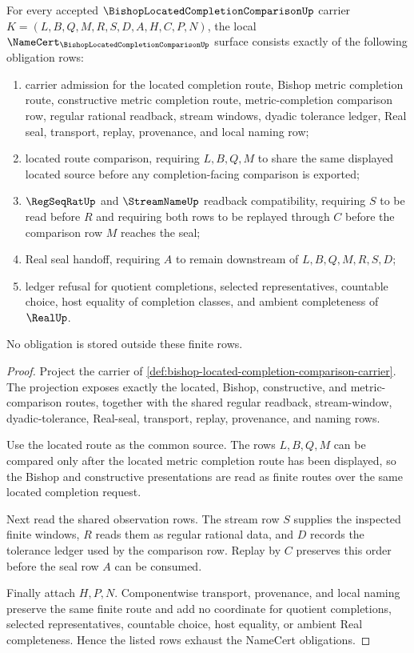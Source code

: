 \begin{theorem}
\label{thm:bishop-located-completion-comparison-namecert-obligations}
For every accepted $\BishopLocatedCompletionComparisonUp$ carrier $K=(L,B,Q,M,R,S,D,A,H,C,P,N)$, the local $\NameCert_{\BishopLocatedCompletionComparisonUp}$ surface consists exactly of the following obligation rows:
\begin{enumerate}
\item carrier admission for the located completion route, Bishop metric completion route, constructive metric completion route, metric-completion comparison row, regular rational readback, stream windows, dyadic tolerance ledger, Real seal, transport, replay, provenance, and local naming row;
\item located route comparison, requiring $L,B,Q,M$ to share the same displayed located source before any completion-facing comparison is exported;
\item $\RegSeqRatUp$ and $\StreamNameUp$ readback compatibility, requiring $S$ to be read before $R$ and requiring both rows to be replayed through $C$ before the comparison row $M$ reaches the seal;
\item Real seal handoff, requiring $A$ to remain downstream of $L,B,Q,M,R,S,D$;
\item ledger refusal for quotient completions, selected representatives, countable choice, host equality of completion classes, and ambient completeness of $\RealUp$.
\end{enumerate}
No obligation is stored outside these finite rows.
\end{theorem}
\begin{proof}
Project the carrier of \autoref{def:bishop-located-completion-comparison-carrier}. The projection exposes exactly the located, Bishop, constructive, and metric-comparison routes, together with the shared regular readback, stream-window, dyadic-tolerance, Real-seal, transport, replay, provenance, and naming rows.

Use the located route as the common source. The rows $L,B,Q,M$ can be compared only after the located metric completion route has been displayed, so the Bishop and constructive presentations are read as finite routes over the same located completion request.

Next read the shared observation rows. The stream row $S$ supplies the inspected finite windows, $R$ reads them as regular rational data, and $D$ records the tolerance ledger used by the comparison row. Replay by $C$ preserves this order before the seal row $A$ can be consumed.

Finally attach $H,P,N$. Componentwise transport, provenance, and local naming preserve the same finite route and add no coordinate for quotient completions, selected representatives, countable choice, host equality, or ambient Real completeness. Hence the listed rows exhaust the NameCert obligations.
\end{proof}

